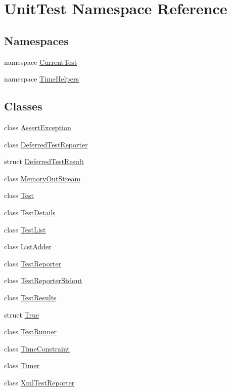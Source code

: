 \hypertarget{namespace_unit_test}{
\section{UnitTest Namespace Reference}
\label{namespace_unit_test}
}
\subsection*{Namespaces}
\begin{CompactItemize}
\item 
namespace \hyperlink{namespace_unit_test_1_1_current_test}{CurrentTest}
\item 
namespace \hyperlink{namespace_unit_test_1_1_time_helpers}{TimeHelpers}
\end{CompactItemize}
\subsection*{Classes}
\begin{CompactItemize}
\item 
class \hyperlink{class_unit_test_1_1_assert_exception}{AssertException}
\item 
class \hyperlink{class_unit_test_1_1_deferred_test_reporter}{DeferredTestReporter}
\item 
struct \hyperlink{struct_unit_test_1_1_deferred_test_result}{DeferredTestResult}
\item 
class \hyperlink{class_unit_test_1_1_memory_out_stream}{MemoryOutStream}
\item 
class \hyperlink{class_unit_test_1_1_test}{Test}
\item 
class \hyperlink{class_unit_test_1_1_test_details}{TestDetails}
\item 
class \hyperlink{class_unit_test_1_1_test_list}{TestList}
\item 
class \hyperlink{class_unit_test_1_1_list_adder}{ListAdder}
\item 
class \hyperlink{class_unit_test_1_1_test_reporter}{TestReporter}
\item 
class \hyperlink{class_unit_test_1_1_test_reporter_stdout}{TestReporterStdout}
\item 
class \hyperlink{class_unit_test_1_1_test_results}{TestResults}
\item 
struct \hyperlink{struct_unit_test_1_1_true}{True}
\item 
class \hyperlink{class_unit_test_1_1_test_runner}{TestRunner}
\item 
class \hyperlink{class_unit_test_1_1_time_constraint}{TimeConstraint}
\item 
class \hyperlink{class_unit_test_1_1_timer}{Timer}
\item 
class \hyperlink{class_unit_test_1_1_xml_test_reporter}{XmlTestReporter}
\end{CompactItemize}
